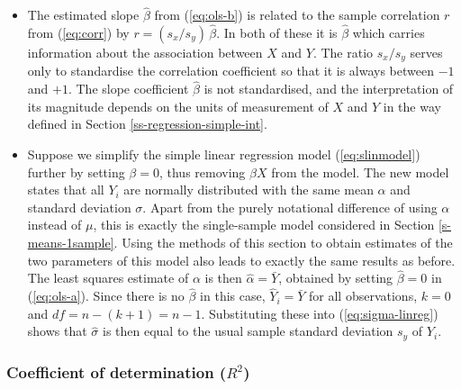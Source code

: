 \documentclass[11pt,a4paper,openany]{book}
\begin{document}
\begin{itemize}
\item
  The estimated slope \(\hat{\beta}\) from (\ref{eq:ols-b}) is related
  to the sample correlation \(r\) from (\ref{eq:corr}) by
  \(r=(s_{x}/s_{y})\,\hat{\beta}\). In both of these it is
  \(\hat{\beta}\) which carries information about the association
  between \(X\) and \(Y\). The ratio \(s_{x}/s_{y}\) serves only to
  standardise the correlation coefficient so that it is always between
  \(-1\) and \(+1\). The slope coefficient \(\hat{\beta}\) is not
  standardised, and the interpretation of its magnitude depends on the
  units of measurement of \(X\) and \(Y\) in the way defined in Section
  \ref{ss-regression-simple-int}.
\item
  Suppose we simplify the simple linear regression model
  (\ref{eq:slinmodel}) further by setting \(\beta=0\), thus removing
  \(\beta X\) from the model. The new model states that all \(Y_{i}\)
  are normally distributed with the same mean \(\alpha\) and standard
  deviation \(\sigma\). Apart from the purely notational difference of
  using \(\alpha\) instead of \(\mu\), this is exactly the single-sample
  model considered in Section \ref{s-means-1sample}. Using the methods
  of this section to obtain estimates of the two parameters of this
  model also leads to exactly the same results as before. The least
  squares estimate of \(\alpha\) is then \(\hat{\alpha}=\bar{Y}\),
  obtained by setting \(\hat{\beta}=0\) in (\ref{eq:ols-a}). Since there
  is no \(\hat{\beta}\) in this case, \(\hat{Y}_{i}=\bar{Y}\) for all
  observations, \(k=0\) and \(df=n-(k+1)=n-1\). Substituting these into
  (\ref{eq:sigma-linreg}) shows that \(\hat{\sigma}\) is then equal to
  the usual sample standard deviation \(s_{y}\) of \(Y_{i}\).
\end{itemize}

\subsubsection*{\texorpdfstring{Coefficient of determination
(\(R^{2}\))}{Coefficient of determination (R\^{}\{2\})}}\label{coefficient-of-determination-r2}
\end{document}
